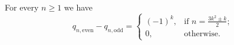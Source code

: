 \begin{lem}
For every $n \ge 1$ we have
\[
q_{n,\mathrm{even}} - q_{n, \mathrm{odd}} =
\begin{cases}
(-1)^k, &\text{if } n = \frac{3k^2 \pm k}2;\\
0, &\text{otherwise.}
\end{cases}
\]
\end{lem}